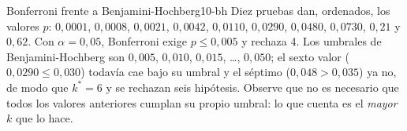 \begin{simbolos}
\end{simbolos}

\begin{ejemplo}{Bonferroni frente a Benjamini-Hochberg}{10-bh}
Diez pruebas dan, ordenados, los valores $p$: $0{,}0001$, $0{,}0008$, $0{,}0021$, $0{,}0042$, $0{,}0110$, $0{,}0290$, $0{,}0480$, $0{,}0730$, $0{,}21$ y $0{,}62$. Con $\alpha=0{,}05$, Bonferroni exige $p\le0{,}005$ y rechaza 4. Los umbrales de Benjamini-Hochberg son $0{,}005$, $0{,}010$, $0{,}015$, \dots, $0{,}050$; el sexto valor ($0{,}0290\le0{,}030$) todavía cae bajo su umbral y el séptimo ($0{,}048>0{,}035$) ya no, de modo que $k^\ast=6$ y se rechazan seis hipótesis. Observe que no es necesario que todos los valores anteriores cumplan su propio umbral: lo que cuenta es el \emph{mayor} $k$ que lo hace.
\end{ejemplo}

